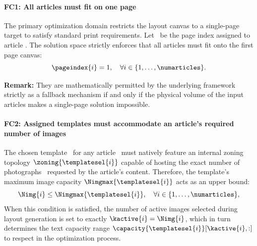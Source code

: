 \paragraph{FC1: All articles must fit on one page}
The primary optimization domain restricts the layout canvas to a single-page target to satisfy standard print requirements. Let \ be the page index assigned to article . The solution space strictly enforces that all articles must fit onto the first page canvas:
\begin{equation}
\pageindex{i} = 1, \quad \forall i \in \{1, \dots, \numarticles\}.
\end{equation}

\textbf{Remark:} They are mathematically permitted by the underlying framework strictly as a fallback mechanism if and only if the physical volume of the input articles makes a single-page solution impossible.

\paragraph{FC2: Assigned templates must accommodate an article's required number of images}
The chosen template \ for any article \ must natively feature an internal zoning topology $\zoning{\templatesel{i}}$ capable of hosting the exact number of photographs \ requested by the article's content. Therefore, the template's maximum image capacity $\Nimgmax{\templatesel{i}}$ acts as an upper bound:
\begin{equation}
\Nimg{i} \le \Nimgmax{\templatesel{i}}, \quad \forall i \in \{1, \dots, \numarticles\},
\end{equation}
When this condition is satisfied, the number of active images selected during layout generation is set to exactly $\kactive{i} = \Nimg{i}$, which in turn determines the text capacity range $\capacity{\templatesel{i}}[\kactive{i}, :]$ to respect in the optimization process.

